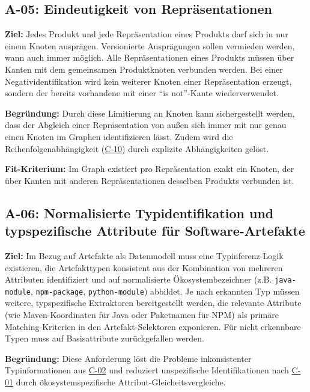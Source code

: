 \subsection{A-05: Eindeutigkeit von Repräsentationen}\label{subsec:req-unique-product-representations}

\textbf{Ziel:}
Jedes Produkt und jede Repräsentation eines Produkts darf sich in nur einem Knoten ausprägen.
Versionierte Ausprägungen sollen vermieden werden, wann auch immer möglich.
Alle Repräsentationen eines Produkts müssen über Kanten mit dem gemeinsamen Produktknoten verbunden werden.
Bei einer Negatividentifikation wird kein weiterer Knoten einer Repräsentation erzeugt, sondern der bereits vorhandene mit einer \enquote{is not}-Kante wiederverwendet.

\textbf{Begründung:}
Durch diese Limitierung an Knoten kann sichergestellt werden, dass der Abgleich einer Repräsentation von außen sich immer mit nur genau einen Knoten im Graphen identifizieren lässt.
Zudem wird die Reihenfolgenabhängigkeit (\hyperref[subsec:c-10-order-dependency]{C-10}) durch explizite Abhängigkeiten gelöst.

\textbf{Fit-Kriterium:}
Im Graph existiert pro Repräsentation exakt ein Knoten, der über Kanten mit anderen Repräsentationen desselben Produkts verbunden ist.

\subsection{A-06: Normalisierte Typidentifikation und typspezifische Attribute für Software-Artefakte}\label{subsec:req-type-specific-matching}

\textbf{Ziel:}
Im Bezug auf Artefakte als Datenmodell muss eine Typinferenz-Logik existieren, die Artefakttypen konsistent aus der Kombination von mehreren Attributen identifiziert und auf normalisierte Ökosystembezeichner (z.B. \texttt{java-module}, \texttt{npm-package}, \texttt{python-module}) abbildet.
Je nach erkannten Typ müssen weitere, typspezifische Extraktoren bereitgestellt werden, die relevante Attribute (wie Maven-Koordinaten für Java oder Paketnamen für NPM) als primäre Matching-Kriterien in den Artefakt-Selektoren exponieren.
Für nicht erkennbare Typen muss auf Basisattribute zurückgefallen werden.

\textbf{Begründung:}
Diese Anforderung löst die Probleme inkonsistenter Typinformationen aus \hyperref[subsec:c-02-uneindeutige-artefakt-typinformation]{C-02} und reduziert unspezifische Identifikationen nach \hyperref[subsec:c-01-unspezifische-identifikation-von-artefakten]{C-01} durch ökosystemspezifische Attribut-Gleicheitsvergleiche.

